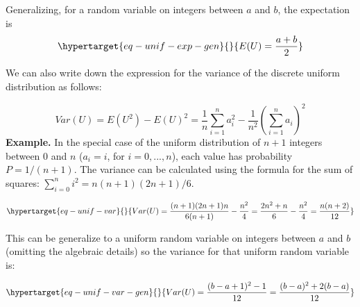 \documentclass[
  letterpaper,
  DIV=11,
  numbers=noendperiod]{scrreprt}
\begin{document}
Generalizing, for a random variable on integers between \(a\) and \(b\),
the expectation is
\begin{equation}\protect\hypertarget{eq-unif-exp-gen}{}{ E(U) = \frac{a+b}{2}}\label{eq-unif-exp-gen}\end{equation}

We can also write down the expression for the variance of the discrete
uniform distribution as follows:

\[ Var(U) = E(U^2) - E(U)^2 =  \frac{1}{n} \sum_{i=1}^n  a_i^2  -  \frac{1}{n^2} \left(\sum_{i=1}^n  a_i \right)^2\]
\textbf{Example.} In the special case of the uniform distribution of
\(n+1\) integers between 0 and \(n\) (\(a_i = i\), for \(i=0,..., n\)),
each value has probability \(P = 1/(n+1)\). The variance can be
calculated using the formula for the sum of squares:
\(\sum_{i=0}^n i^2 =n(n+1)(2n+1)/6\).

\begin{equation}\protect\hypertarget{eq-unif-var}{}{ Var(U) = \frac{(n+1)(2n+1)n}{6(n+1)} - \frac{n^2}{4} =   \frac{2n^2+n}{6} - \frac{n^2}{4} = \frac{n(n+2)}{12}
}\label{eq-unif-var}\end{equation}

This can be generalize to a uniform random variable on integers between
\(a\) and \(b\) (omitting the algebraic details) so the variance for
that uniform random variable is:

\begin{equation}\protect\hypertarget{eq-unif-var-gen}{}{ Var(U) = \frac{(b-a+1)^2 - 1}{12} = \frac{(b-a)^2 + 2(b-a)}{12}
}\label{eq-unif-var-gen}\end{equation}
\end{document}
